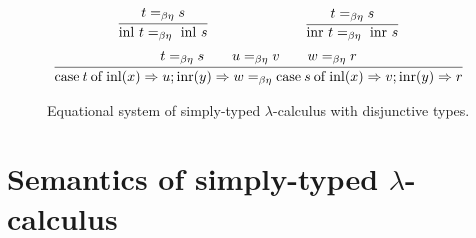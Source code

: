 \documentclass[a4paper, 11pt]{article}
\theoremstyle{definition}
\begin{document}
\begin{figure}
\begin{minipage}{1\textwidth}
        \noindent\dotfill{}
        \begin{align*}
                \infer{
                        \inl\ t =_{\beta \eta}\ \inl\ s
                }{
                        t =_{\beta \eta} s
                }
                \hspace{2.5cm}
                \infer{
                        \inr\ t =_{\beta \eta}\ \inr\ s
                }{
                        t =_{\beta \eta} s
                }
         \end{align*}
         \begin{align*}
                \infer{
                        \mathrm{case} \> t \> \mathrm{of} \>
                        \inl(x) \Rightarrow u;  \inr(y) \Rightarrow w
                        =_{\beta \eta}
                        \mathrm{case} \> s \> \mathrm{of} \>
                        \inl(x) \Rightarrow v;  \inr(y) \Rightarrow r
                }
                {
                       t =_{\beta \eta} s \qquad
                       u =_{\beta \eta} v \qquad
                       w =_{\beta \eta} r 
                }
        \end{align*}
\end{minipage}
\caption{Equational system of simply-typed $\lambda$-calculus with disjunctive types.}
\label{fig:eq_calc_disj}
\end{figure}

\section{Semantics of simply-typed $\lambda$-calculus}
\end{document}
